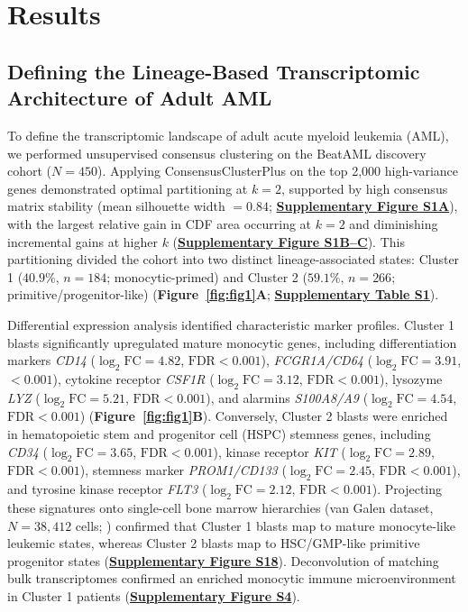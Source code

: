 \documentclass[11pt,a4paper]{article}
\begin{document}
\section{Results}

\subsection{Defining the Lineage-Based Transcriptomic Architecture of Adult AML}

To define the transcriptomic landscape of adult acute myeloid leukemia (AML), we performed unsupervised consensus clustering on the BeatAML discovery cohort ($N=450$). Applying ConsensusClusterPlus on the top 2,000 high-variance genes demonstrated optimal partitioning at $k=2$, supported by high consensus matrix stability (mean silhouette width $=0.84$; \textbf{\href{Supplementary_Methods.pdf}{\textbf{Supplementary Figure S1A}}}), with the largest relative gain in CDF area occurring at $k=2$ and diminishing incremental gains at higher $k$ (\textbf{\href{Supplementary_Methods.pdf}{\textbf{Supplementary Figure S1B--C}}}). This partitioning divided the cohort into two distinct lineage-associated states: Cluster 1 ($40.9\%$, $n=184$; monocytic-primed) and Cluster 2 ($59.1\%$, $n=266$; primitive/progenitor-like) (\textbf{Figure~\ref{fig:fig1}A}; \href{Supplementary_Methods.pdf}{\textbf{Supplementary Table S1}}).

Differential expression analysis identified characteristic marker profiles. Cluster 1 blasts significantly upregulated mature monocytic genes, including differentiation markers \textit{CD14} ($\log_2\text{FC} = 4.82$, $\text{FDR} < 0.001$), \textit{FCGR1A/CD64} ($\log_2\text{FC} = 3.91$,  $< 0.001$), cytokine receptor \textit{CSF1R} ($\log_2\text{FC} = 3.12$, $\text{FDR} < 0.001$), lysozyme \textit{LYZ} ($\log_2\text{FC} = 5.21$, $\text{FDR} < 0.001$), and alarmins \textit{S100A8/A9} ($\log_2\text{FC} = 4.54$, $\text{FDR} < 0.001$) (\textbf{Figure~\ref{fig:fig1}B}). Conversely, Cluster 2 blasts were enriched in hematopoietic stem and progenitor cell (HSPC) stemness genes, including \textit{CD34} ($\log_2\text{FC} = 3.65$, $\text{FDR} < 0.001$), kinase receptor \textit{KIT} ($\log_2\text{FC} = 2.89$, $\text{FDR} < 0.001$), stemness marker \textit{PROM1/CD133} ($\log_2\text{FC} = 2.45$, $\text{FDR} < 0.001$), and tyrosine kinase receptor \textit{FLT3} ($\log_2\text{FC} = 2.12$, $\text{FDR} < 0.001$). Projecting these signatures onto single-cell bone marrow hierarchies (van Galen dataset, $N=38{,}412$ cells; \cite{vangalen2019single}) confirmed that Cluster 1 blasts map to mature monocyte-like leukemic states, whereas Cluster 2 blasts map to HSC/GMP-like primitive progenitor states (\textbf{\href{Supplementary_Methods.pdf}{\textbf{Supplementary Figure S18}}}). Deconvolution of matching bulk transcriptomes confirmed an enriched monocytic immune microenvironment in Cluster 1 patients (\textbf{\href{Supplementary_Methods.pdf}{\textbf{Supplementary Figure S4}}}).
\end{document}
